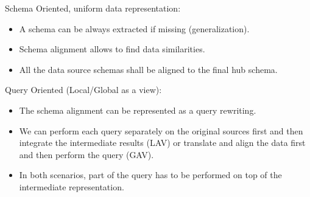 \begin{multilucido}
	\begin{sottolucido}
		Schema Oriented, uniform data representation:
		\begin{itemize}
			\item A schema can be always extracted if missing (generalization).
			\item Schema alignment allows to find data similarities.
			\item All the data source schemas shall be aligned to the final hub schema.
		\end{itemize}
	\end{sottolucido}

	\begin{sottolucido}
		Query Oriented (Local/Global as a view):
		\begin{itemize}
			\item The schema alignment can be represented as a query rewriting.
			
			\item We can perform each query separately on the original sources first and then integrate the intermediate results (LAV) or translate and align the data first and then perform the query (GAV).
			
			\item  In both scenarios, part of the query has to be performed on top of the intermediate representation.		
		\end{itemize}
	\end{sottolucido}
\end{multilucido}
